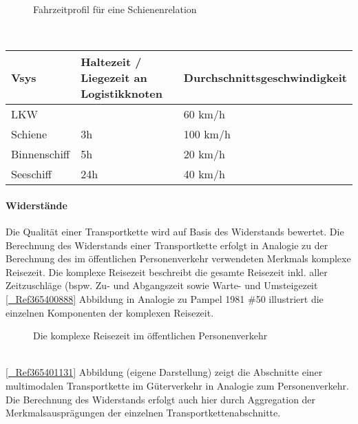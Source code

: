 \begin{figure}[htbp]
  \centering
  \caption{ Fahrzeitprofil für eine Schienenrelation}
  \label{_Ref366260690}
\end{figure}
~\\

\begin{table}[htbp]
  \centering
\begin{tabular}{|p{3cm}|p{3cm}|p{3cm}|}\hline
Vsys & Haltezeit / Liegezeit an Logistikknoten & Durchschnittsgeschwindigkeit \\\hline
LKW &  & 60 km/h\\\hline
Schiene & 3h & 100 km/h\\\hline
Binnenschiff & 5h & 20 km/h\\\hline
Seeschiff & 24h & 40 km/h\\\hline
\end{tabular}
\end{table}


% 
\paragraph{Widerstände}
Die Qualität einer Transportkette wird auf Basis des Widerstands bewertet. Die Berechnung des Widerstands einer Transportkette erfolgt in Analogie zu der Berechnung des im öffentlichen Personenverkehr verwendeten Merkmals \glqq komplexe Reisezeit\grqq . Die komplexe Reisezeit beschreibt die gesamte Reisezeit inkl. aller Zeitzuschläge (bspw. Zu- und Abgangszeit sowie Warte- und Umsteigezeit  \autocites[][]{bib.213} \autocites[][]{bib.352} \autoref{_Ref365400888} Abbildung  {in Analogie zu  Pampel 1981 \#50} illustriert die einzelnen Komponenten der komplexen Reisezeit.~\\

\begin{figure}[htbp]
  \centering
  \caption{ Die komplexe Reisezeit im öffentlichen Personenverkehr}
  \label{_Ref365400888}
\end{figure}
~\\
\autoref{_Ref365401131} Abbildung  (eigene Darstellung) zeigt die Abschnitte einer multimodalen Transportkette im Güterverkehr in Analogie zum Personenverkehr. Die Berechnung des Widerstands erfolgt auch hier durch Aggregation der Merkmalsausprägungen der einzelnen Transportkettenabschnitte.~\\

